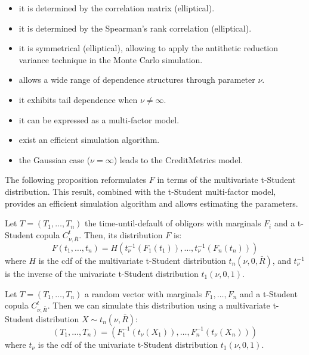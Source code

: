 \documentclass[11pt,fleqn]{book} %
\begin{document}
\begin{itemize}
	\item it is determined by the correlation matrix (elliptical). 
	\item it is determined by the Spearman's rank correlation (elliptical). 
	\item it is symmetrical (elliptical), allowing to 
	apply the antithetic reduction variance technique in the Monte Carlo 
	simulation.
	\item allows a wide range of dependence structures through parameter $\nu$.
	\item it exhibits tail dependence when $\nu \ne \infty$.
	\item it can be expressed as a multi-factor model.
	\item exist an efficient simulation algorithm.
	\item the Gaussian case ($\nu = \infty$) leads to the 
	CreditMetrics\texttrademark{} model.
\end{itemize}

The following proposition reformulates $F$ in terms of the multivariate 
t-Student distribution. This result, combined with the t-Student multi-factor 
model, provides an efficient simulation algorithm and allows estimating the 
parameters.

\begin{proposition}
	\label{prop:dtd}
	Let $T=(T_1,\dots,T_n)$ the time-until-default of obligors with marginals 
	$F_i$ and a t-Student copula $C_{\nu,\bar{R}}^t$. Then, its distribution 
	$F$ is:
	\begin{displaymath}
		F(t_1,\dots,t_n) = H\left(t_\nu^{-1}(F_1(t_1)), \dots, t_\nu^{-1}(F_n(t_n))\right)
	\end{displaymath}
	where $H$ is the cdf of the multivariate t-Student distribution 
	$t_n(\nu,0,\bar{R})$, and $t_\nu^{-1}$ is the inverse of the univariate 
	t-Student distribution $t_1(\nu,0,1)$.
\end{proposition}

\begin{corollary}
	\label{cor:dts1}
	Let $T=(T_1, \dots, T_n)$ a random vector with marginals 
	$F_1, \dots, F_n$ and a t-Student copula $C_{\nu,\bar{R}}^t$. 
	Then we can simulate this distribution using a multivariate t-Student 
	distribution $X \sim t_n(\nu,\bar{R})$:
	\begin{displaymath}
		(T_1, \dots, T_n) = \left(F_1^{-1}\left(t_{\nu}(X_1)\right), \dots, F_n^{-1}\left(t_{\nu}(X_n)\right)\right)
	\end{displaymath}
	where $t_\nu$ is the cdf of the univariate t-Student distribution $t_1(\nu,0,1)$.
\end{corollary}
\end{document}
